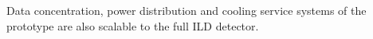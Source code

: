 %
Data concentration, power distribution and cooling service systems of the prototype are also scalable to the full ILD detector. 

